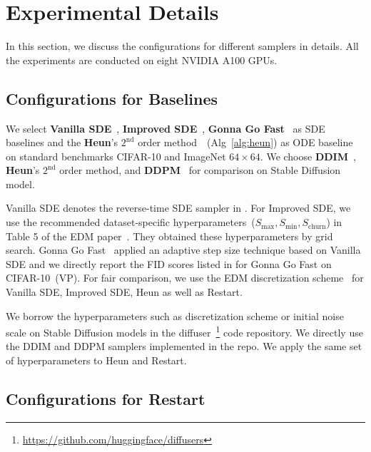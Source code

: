 \section{Experimental Details}
\label{app:exp-details}

In this section, we discuss the configurations for different samplers in details. All the experiments are conducted on eight NVIDIA A100 GPUs.

\subsection{Configurations for Baselines}

We select \textbf{Vanilla SDE}~\cite{Song2020ScoreBasedGM}, \textbf{Improved SDE}~\cite{Karras2022ElucidatingTD}, \textbf{Gonna Go Fast}~\cite{JolicoeurMartineau2021GottaGF} as SDE baselines and the \textbf{Heun}'s $2^{\textrm{nd}}$ order method~\cite{Ascher1998ComputerMF}~(Alg~\ref{alg:heun}) as ODE baseline on standard benchmarks CIFAR-10 and ImageNet $64\times 64$. We choose \textbf{DDIM}~\cite{Song2020DenoisingDI}, \textbf{Heun}'s $2^{\textrm{nd}}$ order method, and \textbf{DDPM}~\cite{Ho2020DenoisingDP} for comparison on Stable Diffusion model.

Vanilla SDE denotes the reverse-time SDE sampler in \cite{Song2020ScoreBasedGM}. For Improved SDE, we use the recommended dataset-specific hyperparameters~(\eg $S_{\textrm{max}}, S_{\textrm{min}}, S_{\textrm{churn}}$) in Table 5 of the EDM paper~\cite{Karras2022ElucidatingTD}. They obtained these hyperparameters by grid search. Gonna Go Fast~\cite{JolicoeurMartineau2021GottaGF} applied an adaptive step size technique based on Vanilla SDE and we directly report the FID scores listed in \cite{JolicoeurMartineau2021GottaGF} for Gonna Go Fast on CIFAR-10~(VP). For fair comparison, we use the EDM discretization scheme~\cite{Karras2022ElucidatingTD} for Vanilla SDE, Improved SDE, Heun as well as Restart.

We borrow the hyperparameters such as discretization scheme or initial noise scale on Stable Diffusion models in the diffuser~\footnote{\url{https://github.com/huggingface/diffusers}} code repository. We directly use the DDIM and DDPM samplers implemented in the repo. We apply the same set of hyperparameters to Heun and Restart.



\subsection{Configurations for Restart}
\label{app:config}

